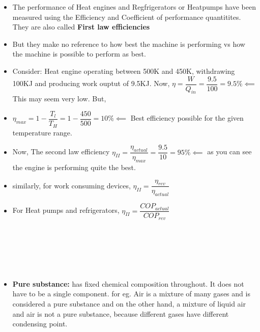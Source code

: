 \documentclass[8pt]{article}
\begin{document}
	\begin{itemize}
		\item The performance of Heat engines and Regfrigerators or Heatpumps have been measured using the Efficiency and Coefficient of performance quantitites. They are also called \textbf{First law efficiencies}
		\item But they make no reference to how best the machine is performing vs how the machine is possible to perform as best.
		\item Consider: Heat engine operating between 500K and 450K, withdrawing 100KJ and producing work ouptut of 9.5KJ. Now, $\eta = \dfrac{W}{Q_{in}} = \dfrac{9.5}{100} = 9.5\% \impliedby$ This may seem very low. But, 
		\item $\eta_{max} = 1-\dfrac{T_l}{T_H} = 1-\dfrac{450}{500} = 10\% \impliedby$ Best efficiency possible for the given temperature range. 
		\item Now, The second law efficiency $\boxed{\eta_{II} = \dfrac{\eta_{actual}}{\eta_{max}}} = \dfrac{9.5}{10} = 95\% \impliedby$ as you can see the engine is performing quite the best. 
		\item similarly, for work consuming devices, $\boxed{\eta_{II}=\dfrac{\eta_{rev}}{\eta_{actual}}}$
		\item For Heat pumps and refrigerators, $\boxed{\eta_{II}=\dfrac{COP_{actual}}{COP_{rev}}}$
	\end{itemize}\hrulefill\\\\
\begin{center}
\subsection*{}
\end{center}	
\\
	\begin{itemize}
		\item \textbf{Pure substance: }has fixed chemical composition throughout. It does not have to be a single component. for eg. Air is a mixture of many gases and is considered a pure substance and on the other hand, a mixture of liquid air and air is not a pure substance, because different gases have different condensing point. 
	\end{itemize}\hrulefill\\\\
\end{document}
